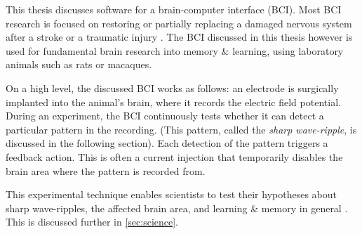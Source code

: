 \label{sec:BCI}

This thesis discusses software for a brain-computer interface (BCI).\footnotemark{} Most BCI research is focused on restoring or partially replacing a damaged nervous system after a stroke or a traumatic injury \cite{Krucoff2016}. The BCI discussed in this thesis however is used for fundamental brain research into memory \& learning, using laboratory animals such as rats or macaques.


On a high level, the discussed BCI works as follows: an electrode is surgically implanted into the animal's brain, where it records the electric field potential. During an experiment, the BCI continuously tests whether it can detect a particular pattern in the recording. (This pattern, called the \emph{sharp wave-ripple}, is discussed in the following section). Each detection of the pattern triggers a feedback action. This is often a current injection that temporarily disables the brain area where the pattern is recorded from.

This experimental technique enables scientists to test their hypotheses about sharp wave-ripples, the affected brain area, and learning \& memory in general \cite{Ego-Stengel2009,Girardeau2009,Jadhav2012,Girardeau2014,Talakoub2016}. This is discussed further in \cref{sec:science}.
